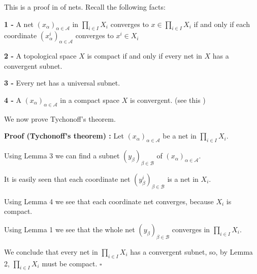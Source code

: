 \documentclass[12pt]{article}
\begin{document}
This is a proof in  of nets. Recall the following facts:

{\bf {} 1 -} A net $(x_{\alpha})_{\alpha \in \mathcal{A}}$ in $\prod_{i \in I}X_i$ converges to
 $x \in \prod_{i \in I}X_i$ if and only if each coordinate $(x_{\alpha}^i)_{\alpha \in \mathcal{A}}$ converges to $x^i \in X_i$

{\bf {} 2 -} A topological space $X$ is compact if and only if every net in $X$ has a convergent subnet.

{\bf {} 3 -} Every net has a universal subnet.

{\bf {} 4 -} A  $(x_{\alpha})_{\alpha \in \mathcal{A}}$ in a compact space $X$ is convergent. (see this )

We now prove Tychonoff's theorem.

{\bf Proof (Tychonoff's theorem) :} Let $(x_{\alpha})_{\alpha \in \mathcal{A}}$ be a net in $\prod_{i \in I}X_i$.

 Using Lemma 3 we can find a  subnet $(y_{\beta})_{\beta \in \mathcal{B}}$ of $(x_{\alpha})_{\alpha \in \mathcal{A}}$.

It is easily seen that each coordinate net $(y_{\beta}^i)_{\beta \in \mathcal{B}}$ is a  net in $X_i$.

Using Lemma 4 we see that each coordinate net converges, because $X_i$ is compact.

Using Lemma 1 we see that the whole net $(y_{\beta})_{\beta \in \mathcal{B}}$ converges in $\prod_{i \in I}X_i$.

We conclude that every net in $\prod_{i \in I}X_i$ has a convergent subnet, so, by Lemma 2, $\prod_{i \in I}X_i$ must be compact. $\square$
\end{document}
